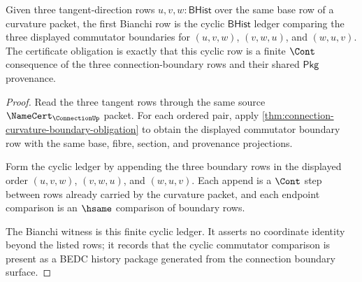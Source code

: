\begin{theorem}
\label{thm:curvature-bianchi-ledger-obligation}
Given three tangent-direction rows $u,v,w:\mathsf{BHist}$ over the same base row of a curvature packet, the first Bianchi row is the cyclic $\mathsf{BHist}$ ledger comparing the three displayed commutator boundaries for $(u,v,w)$, $(v,w,u)$, and $(w,u,v)$. The certificate obligation is exactly that this cyclic row is a finite $\Cont$ consequence of the three connection-boundary rows and their shared $\mathsf{Pkg}$ provenance.
\end{theorem}
\begin{proof}
Read the three tangent rows through the same source $\NameCert_{\ConnectionUp}$ packet. For each ordered pair, apply \autoref{thm:connection-curvature-boundary-obligation} to obtain the displayed commutator boundary row with the same base, fibre, section, and provenance projections.

Form the cyclic ledger by appending the three boundary rows in the displayed order $(u,v,w)$, $(v,w,u)$, and $(w,u,v)$. Each append is a $\Cont$ step between rows already carried by the curvature packet, and each endpoint comparison is an $\hsame$ comparison of boundary rows.

The Bianchi witness is this finite cyclic ledger. It asserts no coordinate identity beyond the listed rows; it records that the cyclic commutator comparison is present as a BEDC history package generated from the connection boundary surface.
\end{proof}

